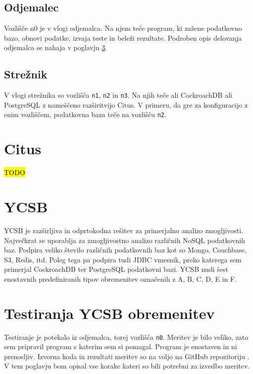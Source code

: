 \documentclass[a4paper, 12pt]{book}
\begin{document}
\subsection{Odjemalec}
Vozlišče n0 je v vlogi odjemalca. Na njem teče program, ki zažene podatkovno bazo, obnovi podatke, izvaja teste in beleži rezultate. Podroben opis delovanja odjemalca se nahaja v poglavju \ref{YCSB_benchmarking_steps}.

\subsection{Strežnik}
V vlogi strežnika so vozlišča \texttt{n1}, \texttt{n2} in \texttt{n3}. Na njih teče ali CockroachDB ali PostgreSQL z nameščeno razširitvijo Citus. V primeru, da gre za konfiguracijo z enim vozliščem, podatkovna baza teče na vozlišču \texttt{n2}.

\section{Citus}
\label{benchmarking/citus}
\hl{TODO}

\section{YCSB}
\label{YCSB_about}
YCSB \cite{brianfrankcooper/YCSB} je razširljiva in odprtokodna rešitev za primerjalno analizo zmogljivosti. Največkrat se uporablja za zmogljivostno analizo različnih NoSQL podatkovnih baz. Podpira veliko število različnih podatkovnih baz kot so  Mongo, Couchbase, S3, Redis, itd. Poleg tega pa podpira tudi JDBC vmesnik, preko katerega sem primerjal CockroachDB ter PostgreSQL podatkovni bazi. YCSB nudi šest enostavnih predefiniranih tipov obremenitev \cite{YCSB-core-workloads} označenih z A, B, C, D, E in F.

\section{Testiranja YCSB obremenitev}
\label{YCSB_benchmarking_steps}
Testiranje je potekalo iz odjemalca, torej vozlišča \texttt{n0}. Meritev je bilo veliko, zato sem pripravil program s katerim sem si pomagal. Program je enostaven in ni prenosljiv. Izvorna koda in rezultati meritev so na voljo na GitHub repozitoriju \cite{matjazmav/diploma-ycsb}. V tem poglavju bom opisal vse korake kateri so bili potrebni za izvedbo meritev.
\end{document}
